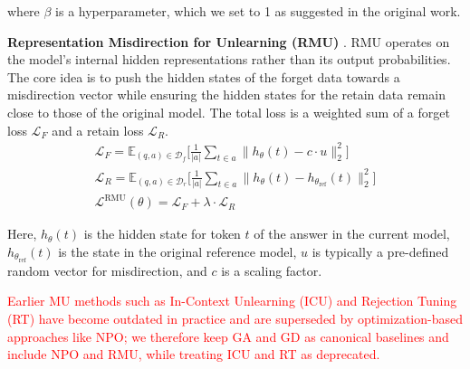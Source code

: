 \documentclass[sigconf,anonymous]{aamas}
\begin{document}
where $\beta$ is a hyperparameter, which we set to 1 as suggested in the original work.

\textbf{Representation Misdirection for Unlearning (RMU)} \cite{li2024wmdp}.
RMU operates on the model's internal hidden representations rather than its output probabilities. The core idea is to push the hidden states of the forget data towards a misdirection vector while ensuring the hidden states for the retain data remain close to those of the original model. The total loss is a weighted sum of a forget loss $\mathcal{L}_F$ and a retain loss $\mathcal{L}_R$.
\begin{gather}
\mathcal{L}_F = \mathbb{E}_{(q,a) \in \mathcal{D}_f}
\Biggl[ \frac{1}{|a|} \sum_{t \in a} \bigl\| h_{\theta}(t) - c \cdot u \bigr\|_2^2 \Biggr] \\
\mathcal{L}_R = \mathbb{E}_{(q,a) \in \mathcal{D}_r}
\Biggl[ \frac{1}{|a|} \sum_{t \in a} \bigl\| h_{\theta}(t) - h_{\theta_{\text{ref}}}(t) \bigr\|_2^2 \Biggr] \\
\mathcal{L}^{\mathrm{RMU}}(\theta) = \mathcal{L}_F + \lambda \cdot \mathcal{L}_R
\end{gather}

Here, $h_{\theta}(t)$ is the hidden state for token $t$ of the answer in the current model, $h_{\theta_{\text{ref}}}(t)$ is the state in the original reference model, $u$ is typically a pre-defined random vector for misdirection, and $c$ is a scaling factor.

\textcolor{red}{
Earlier MU methods such as In-Context Unlearning (ICU) \cite{pmlr-v235-pawelczyk24a} and Rejection Tuning (RT) \cite{tofu2024} have become outdated in practice and are superseded by optimization-based approaches like NPO; we therefore keep GA and GD as canonical baselines and include NPO and RMU, while treating ICU and RT as deprecated.
}





\end{document}
